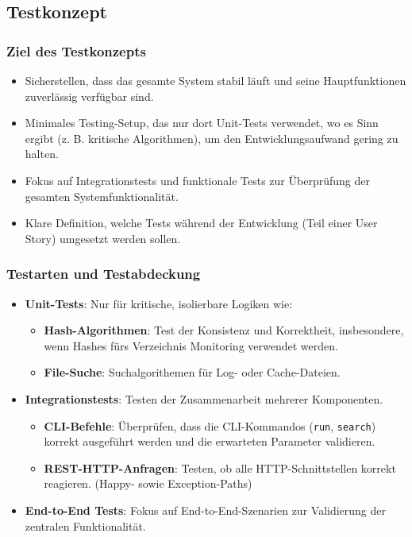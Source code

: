 \documentclass[a4paper,12pt]{report}
\begin{document}
    \clearpage

    \subsection{Testkonzept}

    \subsubsection{Ziel des Testkonzepts}
    \begin{itemize}
        \item Sicherstellen, dass das gesamte System stabil läuft und seine Hauptfunktionen zuverlässig verfügbar sind.
        \item Minimales Testing-Setup, das nur dort Unit-Tests verwendet, wo es Sinn ergibt (z. B. kritische Algorithmen), um den Entwicklungsaufwand gering zu halten.
        \item Fokus auf Integrationstests und funktionale Tests zur Überprüfung der gesamten Systemfunktionalität.
        \item Klare Definition, welche Tests während der Entwicklung (Teil einer User Story) umgesetzt werden sollen.
    \end{itemize}

    \subsubsection{Testarten und Testabdeckung}
    \begin{itemize}
        \item \textbf{Unit-Tests}: Nur für kritische, isolierbare Logiken wie:
        \begin{itemize}
            \item \textbf{Hash-Algorithmen}: Test der Konsistenz und Korrektheit, insbesondere, wenn Hashes fürs Verzeichnis Monitoring verwendet werden.
            \item \textbf{File-Suche}: Suchalgorithemen für Log- oder Cache-Dateien.
        \end{itemize}
        \item \textbf{Integrationstests}: Testen der Zusammenarbeit mehrerer Komponenten.
        \begin{itemize}
            \item \textbf{CLI-Befehle}: Überprüfen, dass die CLI-Kommandos (\texttt{run}, \texttt{search}) korrekt ausgeführt werden und die erwarteten Parameter validieren.
            \item \textbf{REST-HTTP-Anfragen}: Testen, ob alle HTTP-Schnittstellen korrekt reagieren. (Happy- sowie Exception-Paths)
        \end{itemize}
        \item \textbf{End-to-End Tests}: Fokus auf End-to-End-Szenarien zur Validierung der zentralen Funktionalität.
    \end{itemize}
\end{document}
